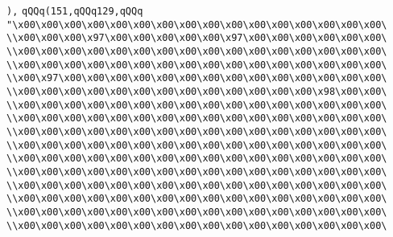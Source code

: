 \verb|),|\newline
\verb|qQQq(151,qQQq129,qQQq|\newline
\verb|"\x00\x00\x00\x00\x00\x00\x00\x00\x00\x00\x00\x00\x00\x00\x00\x00\|\newline
\verb|\\x00\x00\x00\x97\x00\x00\x00\x00\x00\x97\x00\x00\x00\x00\x00\x00\|\newline
\verb|\\x00\x00\x00\x00\x00\x00\x00\x00\x00\x00\x00\x00\x00\x00\x00\x00\|\newline
\verb|\\x00\x00\x00\x00\x00\x00\x00\x00\x00\x00\x00\x00\x00\x00\x00\x00\|\newline
\verb|\\x00\x97\x00\x00\x00\x00\x00\x00\x00\x00\x00\x00\x00\x00\x00\x00\|\newline
\verb|\\x00\x00\x00\x00\x00\x00\x00\x00\x00\x00\x00\x00\x00\x98\x00\x00\|\newline
\verb|\\x00\x00\x00\x00\x00\x00\x00\x00\x00\x00\x00\x00\x00\x00\x00\x00\|\newline
\verb|\\x00\x00\x00\x00\x00\x00\x00\x00\x00\x00\x00\x00\x00\x00\x00\x00\|\newline
\verb|\\x00\x00\x00\x00\x00\x00\x00\x00\x00\x00\x00\x00\x00\x00\x00\x00\|\newline
\verb|\\x00\x00\x00\x00\x00\x00\x00\x00\x00\x00\x00\x00\x00\x00\x00\x00\|\newline
\verb|\\x00\x00\x00\x00\x00\x00\x00\x00\x00\x00\x00\x00\x00\x00\x00\x00\|\newline
\verb|\\x00\x00\x00\x00\x00\x00\x00\x00\x00\x00\x00\x00\x00\x00\x00\x00\|\newline
\verb|\\x00\x00\x00\x00\x00\x00\x00\x00\x00\x00\x00\x00\x00\x00\x00\x00\|\newline
\verb|\\x00\x00\x00\x00\x00\x00\x00\x00\x00\x00\x00\x00\x00\x00\x00\x00\|\newline
\verb|\\x00\x00\x00\x00\x00\x00\x00\x00\x00\x00\x00\x00\x00\x00\x00\x00\|\newline
\verb|\\x00\x00\x00\x00\x00\x00\x00\x00\x00\x00\x00\x00\x00\x00\x00\x00\|\newline
